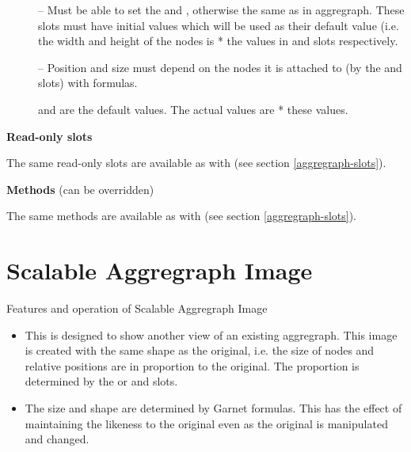 \begin{description}
\begin{description}
\item[]                  -- Must be able to set the  and
                , otherwise the same as in aggregraph.  These slots must
have initial values which will be used as their default value (i.e. the width
and height of the nodes is  * the values in  and 
slots respectively.

\item[]                  -- Position and size must depend on the nodes
it is attached to (by the  and  slots) with formulas.

\item[]  and  are the default
values.  The actual values are  * these values.
        \end{description}

\item[] {\bf Read-only slots}

\item[] The same read-only slots are available as with 
(see section \ref{aggregraph-slots}).

\item[] {\bf Methods} (can be overridden)

\item[] The same methods are available as with  (see section
\ref{aggregraph-slots}).

\item[] \section{Scalable Aggregraph Image}

\item[] Features and operation of Scalable Aggregraph Image
        \begin{itemize}
\item                 This is designed to show another view of an
                existing aggregraph.  This image is created with the
                same shape as the original, i.e. the size of nodes and
                relative positions are in proportion to the original.
                The proportion is determined by the  or
                 and  slots.

\item                 The size and shape are determined by Garnet formulas.
                This has the effect of maintaining the likeness to the
                original even as the original is manipulated and
                changed.


\end{itemize}
\end{description}
